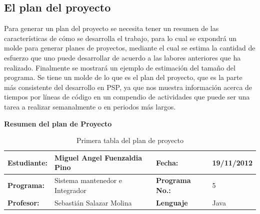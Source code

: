 \documentclass[a4paper,12pt,openany,oneside]{book}
\begin{document}
\subsection{El plan del proyecto}
Para generar un plan del proyecto se necesita tener un resumen de las características de cómo se desarrolla el trabajo, para lo cual se expondrá un molde para generar planes de proyectos, mediante el cual se estima la cantidad de esfuerzo que uno puede desarrollar de acuerdo a las labores anteriores que ha realizado. Finalmente se mostrará un ejemplo de estimación del tamaño del programa. Se tiene un molde de lo que es el plan del proyecto, que es la parte más consistente del desarrollo en PSP, ya que nos muestra información acerca de tiempos por líneas de código en un compendio de actividades que puede ser una tarea a realizar semanalmente o en periodos más largos.
\begin{table}
\textbf{Resumen del plan de Proyecto}\\
\begin{tabular}{| l | l | l | l |}
\hline
\textbf{Estudiante:} & Miguel Angel Fuenzaldia Pino & \textbf{Fecha:} & 19/11/2012\\
\hline
\textbf{Programa:} & Sistema mantenedor e Integrador & \textbf{Programa No.:} & 5\\
\hline
\textbf{Profesor:} & Sebastián Salazar Molina & \textbf{Lenguaje} & Java  \\
\hline
\end{tabular}
\caption{Primera tabla del plan de proyecto}
\end{table}
\end{document}
